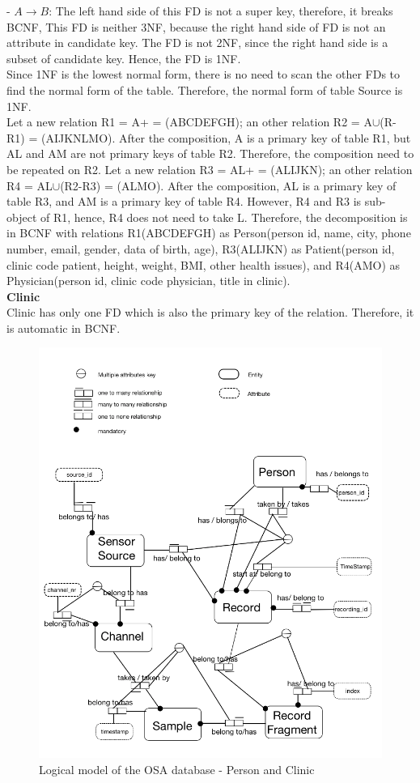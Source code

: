 - $A \rightarrow B$: The left hand side of this FD is not a super key, therefore, it breaks BCNF, This FD is neither 3NF, because the right hand side of FD is not an attribute in candidate key. The FD is not 2NF, since the right hand side is a subset of candidate key. Hence, the FD is 1NF.\\
Since 1NF is the lowest normal form, there is no need to scan the other FDs to find the normal form of the table. Therefore, the normal form of table Source is 1NF.\\
Let a new relation R1 = A+ = (ABCDEFGH); an other relation R2 = A$\cup$(R-R1) = (AIJKNLMO). After the composition, A is a primary key of table R1, but AL and AM are not primary keys of table R2. Therefore, the composition need to be repeated on R2. Let a new relation R3 = AL+ = (ALIJKN); an other relation R4 = AL$\cup$(R2-R3) = (ALMO). After the composition, AL is a primary key of table R3, and AM is a primary key of table R4. However, R4 and R3 is sub-object of R1, hence, R4 does not need to take L. Therefore, the decomposition is in BCNF with relations R1(ABCDEFGH) as Person(person id, name, city, phone number, email, gender, data of birth, age), R3(ALIJKN) as Patient(person id, clinic code patient, height, weight, BMI, other health issues), and R4(AMO) as Physician(person id, clinic code physician, title in clinic).\\
\textbf{Clinic}\\
Clinic has only one FD which is also the primary key of the relation. Therefore, it is automatic in BCNF.\\
\begin{figure}[ht]
    \centering
    \includegraphics[width=1.0\textwidth]{Figures/LogicalModelDB1.png}
    \caption{Logical model of the OSA database - Person and Clinic}
    \label{fig:Figures/LogicalModelDB1}
\end{figure}
